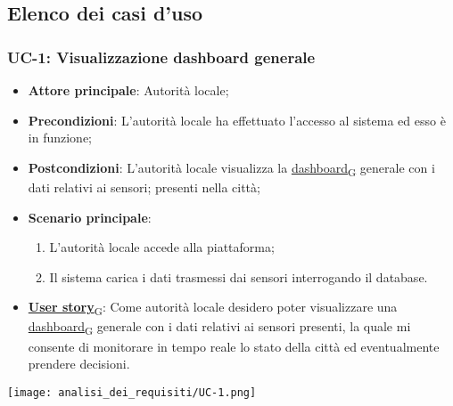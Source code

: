 \subsection{Elenco dei casi d'uso}
\subsubsection{UC-1: Visualizzazione dashboard generale}
\begin{itemize}
	\item \textbf{Attore principale}: Autorità locale;
	\item \textbf{Precondizioni}: L'autorità locale ha effettuato l'accesso al sistema ed esso è in funzione;
	\item \textbf{Postcondizioni}: L'autorità locale visualizza la \href{https://7last.github.io/docs/rtb/documentazione-interna/glossario\#dashboard}{dashboard\textsubscript{G}} generale con i dati relativi ai sensori;
	      presenti nella città;
	\item \textbf{Scenario principale}:
	      \begin{enumerate}
		      \item L'autorità locale accede alla piattaforma;
		      \item Il sistema carica i dati trasmessi dai sensori interrogando il database.
	      \end{enumerate}
	\item \href{https://7last.github.io/docs/rtb/documentazione-interna/glossario\#user-story}{\textbf{User story}\textsubscript{G}}: Come autorità locale desidero poter visualizzare una \href{https://7last.github.io/docs/rtb/documentazione-interna/glossario\#dashboard}{dashboard\textsubscript{G}} generale con i dati relativi ai sensori presenti,
	      la quale mi consente di monitorare in tempo reale lo stato della città ed eventualmente prendere decisioni.
\end{itemize}

\begin{center}
	\texttt{[image: analisi\_dei\_requisiti/UC-1.png]}
\end{center}

